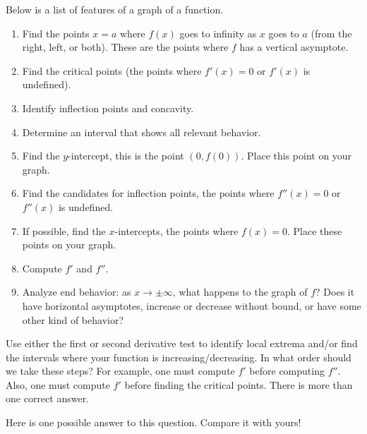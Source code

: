 \documentclass{ximera}
\begin{document}
\begin{problem}%
  Below is a list of features of a graph of a function.
  \begin{enumerate}
  \item Find the points $x=a$ where
    $f(x)$ goes to infinity as $x$ goes to $a$ (from the right, left,
    or both). These are the points where $f$ has a  vertical asymptote.
  \item Find the critical points (the points where $f'(x) = 0$ or
    $f'(x)$ is undefined).
 
  \item Identify inflection points and concavity.
  \item Determine an interval that shows all relevant behavior.
  \item Find the $y$-intercept, this is the point $(0,f(0))$. Place this
    point on your graph.
      \item Find the candidates for inflection points, the points where
    $f''(x) = 0$ or $f''(x)$ is undefined.
  \item If possible, find the $x$-intercepts, the points where $f(x) =
    0$. Place these points on your graph.
       \item Compute $f'$ and $f''$.
  \item Analyze end behavior:  as $x \to \pm \infty$, what happens to the graph of $f$?  Does it  have horizontal asymptotes, increase or decrease without bound, or have some other kind of behavior?
 \end{enumerate}
  Use either the first or second derivative test to identify local extrema and/or
    find the intervals where your function is increasing/decreasing.
  In what order should we take these steps? For example, one must compute
   $f'$ before computing $f''$. Also, one must compute $f'$ before 
   finding the critical points. There is more than one correct answer.
  \begin{freeResponse}
  Here is one possible answer to this question.  Compare it with yours!
\end{freeResponse}
\end{problem}
\end{document}
